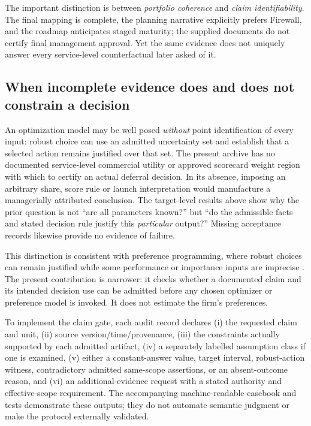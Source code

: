 \documentclass[systems,article,submit,moreauthors]{Definitions/mdpi}
\begin{document}
The important distinction is between \emph{portfolio coherence} and \emph{claim identifiability}. The final mapping is complete, the planning narrative explicitly prefers Firewall, and the roadmap anticipates staged maturity; the supplied documents do not certify final management approval. Yet the same evidence does not uniquely answer every service-level counterfactual later asked of it.

\subsection{When incomplete evidence does and does not constrain a decision}
An optimization model may be well posed \emph{without} point identification of every input: robust choice can use an admitted uncertainty set and establish that a selected action remains justified over that set. The present archive has no documented service-level commercial utility or approved scorecard weight region with which to certify an actual deferral decision. In its absence, imposing an arbitrary share, score rule or launch interpretation would manufacture a managerially attributed conclusion. The target-level results above show why the prior question is not ``are all parameters known?'' but ``do the admissible facts and stated decision rule justify this \emph{particular} output?'' Missing acceptance records likewise provide no evidence of failure.

This distinction is consistent with preference programming, where robust choices can remain justified while some performance or importance inputs are imprecise \cite{LiesioMildSalo2007}. The present contribution is narrower: it checks whether a documented claim and its intended decision use can be admitted before any chosen optimizer or preference model is invoked. It does not estimate the firm's preferences.

To implement the claim gate, each audit record declares (i) the requested claim and unit, (ii) source version/time/provenance, (iii) the constraints actually supported by each admitted artifact, (iv) a separately labelled assumption class if one is examined, (v) either a constant-answer value, target interval, robust-action witness, contradictory admitted same-scope assertions, or an absent-outcome reason, and (vi) an additional-evidence request with a stated authority and effective-scope requirement. The accompanying machine-readable casebook and tests demonstrate these outputs; they do not automate semantic judgment or make the protocol externally validated.
\end{document}

